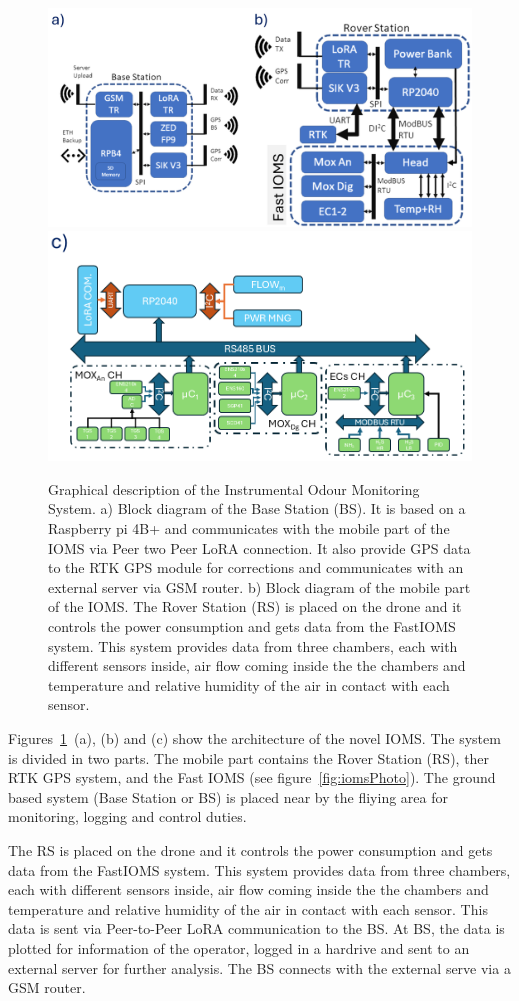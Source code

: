 \documentclass[lettersize,journal]{IEEEtran}
\begin{document}
\begin{figure}[t] %
	\centering
	\includegraphics[width=0.53\linewidth]{./images/fig1_ab.png}
	\hfill
	\includegraphics[width=0.45\linewidth]{./images/fig1_c.png}
	\hfill
	\caption{Graphical description of the Instrumental Odour Monitoring System. a) Block diagram of the Base Station (BS). It is based on a Raspberry pi 4B+ and communicates with the mobile part of the IOMS via Peer two Peer LoRA connection. It also provide GPS data to the RTK GPS module for corrections and communicates with an external server via GSM router. b) Block diagram of the mobile part of the IOMS. The Rover Station (RS) is placed on the drone and it controls the power consumption and gets data from the FastIOMS system. This system provides data from three chambers, each with different sensors inside, air flow coming inside the the chambers and temperature and relative humidity of the air in contact with each sensor.}
	\label{fig:iomsDescp}
\end{figure}

Figures~\ref{fig:iomsDescp}~(a), (b) and (c) show the architecture of the novel IOMS. The system is divided in two parts. The mobile part contains the Rover Station (RS), ther RTK GPS system, and the Fast IOMS (see figure~\ref{fig:iomsPhoto}). The ground based system (Base Station or BS) is placed near by the fliying area for monitoring, logging and control duties.

The RS is placed on the drone and it controls the power consumption and gets data from the FastIOMS system. This system provides data from three chambers, each with different sensors inside, air flow coming inside the the chambers and temperature and relative humidity of the air in contact with each sensor. This data is sent via Peer-to-Peer LoRA communication to the BS. At BS, the data is plotted for information of the operator, logged in a hardrive and sent to an external server for further analysis. The BS connects with the external serve via a GSM router.
\end{document}
